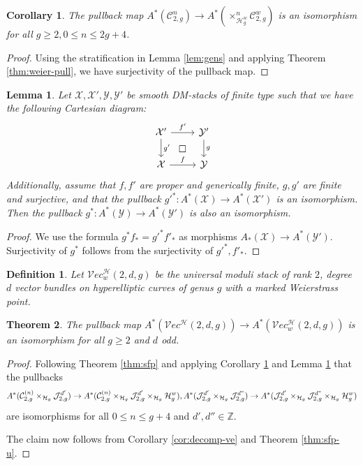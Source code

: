 \documentclass[11pt]{amsart}
\newcommand\Z{\mathbb{Z}}
\newtheorem{theorem}{Theorem}[section]
\newtheorem{definition}{Definition}[subsection]
\newtheorem{corollary}{Corollary}[theorem]
\newtheorem{lemma}[theorem]{Lemma}
\theoremstyle{definition}
\newcommand{\ri}{\rightarrow}
\newcommand{\jac}{\mathcal{J}}
\newcommand{\x}{\mathcal{X}}
\newcommand{\y}{\mathcal{Y}}
\newcommand{\h}{\mathcal{H}}
\newcommand{\ve}{\mathcal{V}ec}
\newcommand{\mC}{\mathcal{C}}
\begin{document}
\begin{corollary}\label{cor:hyp-weier-powers}
    The pullback map $A^*(\mC_{2,g}^n)\ri A^*(\times_{\h_{g}^w}^n\mC_{2,g}^w)$ is an isomorphism for all $g\geq 2, 0\leq n\leq 2g+4$.
\end{corollary}
\begin{proof}
Using the stratification in Lemma \ref{lem:gens} and applying Theorem \ref{thm:weier-pull}, we have surjectivity of the pullback map.
\end{proof}
\begin{lemma}\label{lem:pull-iso}
    Let $\mathcal{X},\x',\y,\y'$ be smooth DM-stacks of finite type such that we have the following Cartesian diagram:
    $$\begin{tikzcd}
\x' \arrow[r, "f'"] \arrow[d, "g'"]\ar[dr, phantom, "\square"] & \y' \arrow[d, "g"] \\
\x \arrow[r, "f"] & \y
    \end{tikzcd}$$
    Additionally, assume that $f,f'$ are proper and generically finite, $g,g'$ are finite and surjective, and that the pullback
    $g'^*:A^*(\x)\ri A^*(\x')$ is an isomorphism. Then the pullback $g^*:A^*(\y)\ri A^*(\y')$ is also an isomorphism.
\end{lemma}
\begin{proof}
    We use the formula $g^*f_* = g'^{*}f'_*$ as morphisms $A_*(\x)\ri A^*(\y')$. Surjectivity of $g^*$ follows from the surjectivity of $g'^*, f'_*$.
\end{proof}
\begin{definition}
    Let $\ve_w^\h(2,d,g)$ be the universal moduli stack of rank $2$, degree $d$ vector bundles on hyperelliptic curves of genus $g$ with a marked Weierstrass point.
\end{definition}
\begin{theorem}\label{thm:vec-pull}
    The pullback map $A^*(\ve^\h(2,d,g))\ri A^*(\ve_w^\h(2,d,g))$ is an isomorphism for all $g\geq 2$ and $d$ odd.
\end{theorem}
\begin{proof}
  Following Theorem \ref{thm:sfp} and applying Corollary \ref{cor:hyp-weier-powers} and Lemma \ref{lem:pull-iso} that the pullbacks
$$A^*(\mC_{2,g}^{(n)}\times_{\h_g} \jac^{d'}_{2,g})\ri A^*(\mC_{2,g}^{(n)}\times_{\h_g} \jac^{d'}_{2,g}\times_{\h_g}\h_g^w), 
A^*(\jac^{d'}_{2,g}\times_{\h_g}\jac^{d"}_{2,g})\ri A^*(\jac^{d'}_{2,g}\times_{\h_g}\jac^{d"}_{2,g}\times_{\h_g}\h_g^w)$$
are isomorphisms for all $0\leq n\leq g+4$ and $d',d''\in\Z$.

The claim now follows from Corollary \ref{cor:decomp-ve} and Theorem \ref{thm:sfp-u}.
\end{proof}
\end{document}
